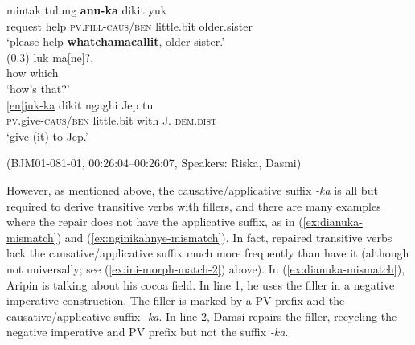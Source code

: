 \documentclass[output=paper,
\ChapterDOI{10.5281/zenodo.15697583}
colorlinks,
citecolor=brown]{langscibook}
\begin{document}
\begin{exe}
    \ex\label{ex:ini-morph-match-2}
    \begin{xlist}[0\quad →A:]
        \gll mintak tulung \textbf{anu-ka} dikit yuk\\
        request help \textsc{pv}.\textsc{fill}-\textsc{caus/ben} little.bit older.sister\\
        \glt `please help \textbf{whatchamacallit}, older sister.' \\
        \exi{} (0.3)
        \gll luk ma[ne]?,\\
        how which\\
        \glt `how's that?' \\
        \gll  \hspace{1.25cm}\uline{[en]juk-ka} dikit ngaghi Jep tu\\
         \hspace{1.25cm}\textsc{pv}.give-\textsc{caus/ben} little.bit with J. \textsc{dem.dist}\\ 
        \glt \hspace{1.25cm}`\uline{give} (it) to Jep.' \\
    \end{xlist}
    \hfill (BJM01-081-01, 00:26:04--00:26:07, Speakers: Riska, Dasmi)
\end{exe}


However, as mentioned above, the causative/applicative suffix \textit{-ka} is all but required to derive transitive verbs with fillers, and there are many examples where the repair does not have the applicative suffix, as in (\ref{ex:dianuka-mismatch}) and (\ref{ex:nginikahnye-mismatch}). In fact, repaired transitive verbs lack the causative/applicative suffix much more frequently than have it (although not universally; see (\ref{ex:ini-morph-match-2}) above). In (\ref{ex:dianuka-mismatch}), Aripin is talking about his cocoa field. In line 1, he uses the filler in a negative imperative construction. The filler is marked by a PV prefix and the causative/applicative suffix \textit{-ka}. In line 2, Damsi repairs the filler, recycling the negative imperative and PV prefix but not the suffix \textit{-ka}.
\end{document}
